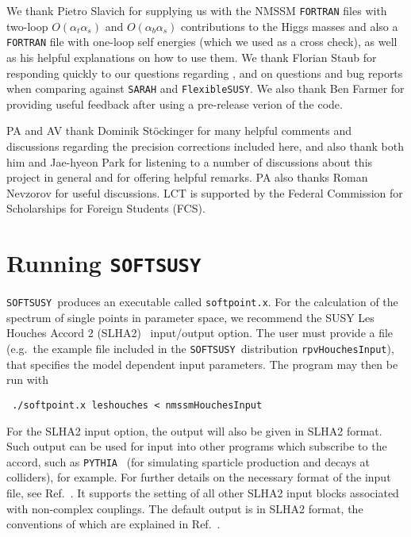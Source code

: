 \documentclass[final,3p,times,pdflatex]{elsarticle}
\def\SOFTSUSY{{\tt SOFTSUSY}}
\def\code#1{\small{\tt #1}\normalsize}
\def\at{\alpha_t}
\def\ab{\alpha_b}
\def\as{\alpha_s}
\def\oatas{O(\at\as)}
\def\oabas{O(\ab\as)}
\begin{document}
We thank Pietro Slavich for supplying us with the NMSSM {\tt FORTRAN} files with
two-loop $\oatas$ and $\oabas$ contributions to the Higgs masses and also a
{\tt FORTRAN} file with one-loop self energies (which we used as a cross check),
 as well as his helpful explanations on how to use them. We thank Florian 
Staub for responding quickly to our questions regarding \cite{Staub:2010ty}, and
 on questions and bug reports when comparing against {\tt SARAH} and 
{\tt FlexibleSUSY}. We also thank Ben Farmer for providing useful feedback after
 using a pre-release verion of the code.  

PA and AV thank Dominik St\"ockinger for many helpful comments and discussions 
regarding the precision corrections included here, and also thank both him and 
Jae-hyeon Park for listening to a number of discussions about this project in 
general and for offering helpful remarks. PA also thanks Roman Nevzorov for 
useful discussions.  LCT is supported by the Federal Commission for Scholarships
 for Foreign Students (FCS).  

\appendix

\section{Running \SOFTSUSY}
\label{sec:run}

\SOFTSUSY~produces an executable called \code{softpoint.x}. For the calculation
of the spectrum of single points in parameter space, we recommend the
SUSY Les Houches Accord 2 (SLHA2)~\cite{Allanach:2008qq}  input/output
option. The user must provide a file (e.g.\ the example file included
in the \SOFTSUSY~distribution
\code{rpvHouchesInput}), that specifies the model dependent input
parameters. The program may then be run with
\small
\begin{verbatim}
 ./softpoint.x leshouches < nmssmHouchesInput
\end{verbatim}
\normalsize
For the SLHA2 input option, 
the output will also be given in 
SLHA2 format. Such output can be used for
input into other programs which subscribe to the accord, such as
\code{PYTHIA}~\cite{Sjostrand:2007gs} (for
simulating sparticle production and decays at colliders), for example. For
further details on the necessary format of 
the input file, see Ref.~\cite{Allanach:2008qq}. It supports 
the setting of all other SLHA2 input blocks associated with non-complex
couplings. 
The default output is in SLHA2 format, the conventions of which are
explained in Ref.~\cite{Allanach:2008qq}. 
\end{document}

